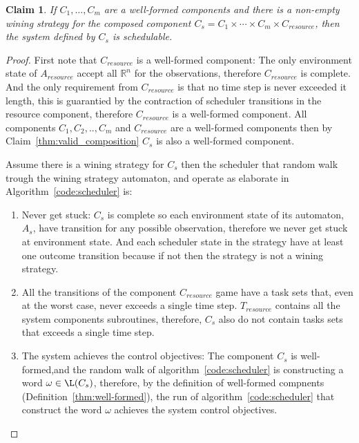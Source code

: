 \documentclass[ twoside, 12pt ]{article}
\newcommand\R{{\mathbb R}}
\newtheorem{claim}[thm]{Claim}
\begin{document}
\begin{claim}
    If $C_1,\dots , C_m$ are a well-formed components and there is a non-empty wining strategy for the composed component $C_s=C_1 \times \cdots \times C_m \times C_ {resource}$, then the system defined by $C_s$ is schedulable.
\end{claim}
\begin{proof}
    First note that $C_{resource}$ is a well-formed component:
    The only environment state of $A_{resource}$ accept all $\R^n$ for the observations, therefore $C_{resource}$ is complete. 
    And the only requirement from $C_{resource}$ is that no time step is never exceeded it length, this is guarantied by the contraction of scheduler transitions in the resource component, therefore  $C_{resource}$ is a well-formed component.
    All components $C_1 , C_2 , .. , C_m$ and $C_{resource} $ are a well-formed components then by Claim~\ref{thm:valid_composition} $C_s $ is also a well-formed component.
    
    Assume there is a wining strategy for $C_s$ then the scheduler that random walk trough the wining strategy automaton, and operate as elaborate in Algorithm~\ref{code:scheduler} is:
    \begin{enumerate}
        \item Never get stuck: $C_s$ is complete so each environment state of its automaton, $A_s$, have transition for any possible observation,
        therefore we never get stuck at environment state.
        And each scheduler state in the strategy have at least one outcome transition because if not then the strategy is not a wining strategy. 
        
        \item All the transitions of the component $C_{resource}$ game have a task sets that, even at the worst case, never exceeds a single time step. 
        $T_{resource}$ contains all the system components subroutines, therefore, $C_s$ also do not contain tasks sets that exceeds a single time step.
        
        \item The system achieves the control objectives: The component $C_s$ is well-formed,and the random walk of algorithm~\ref{code:scheduler} is constructing a word $\omega \in \L(C_s)$, therefore, by the definition of well-formed compnents (Definition~\ref{thm:well-formed}), the run of algorithm~\ref{code:scheduler} that construct the word $\omega$ achieves the system control objectives.
    \end{enumerate}
\end{proof}
\end{document}
